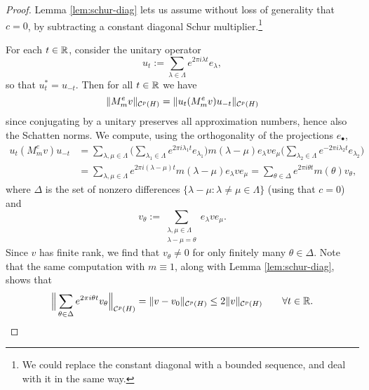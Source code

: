 \begin{proof}
  Lemma \ref{lem:schur-diag} lets us assume without loss of generality that $c = 0$, by subtracting a constant diagonal Schur multiplier.\footnote{We could replace the constant diagonal with a bounded sequence, and deal with it in the same way.}
  
  For each $t \in \mathbb{R}$, consider the unitary operator
  \begin{equation*}
    u_{t} := \sum_{\lambda \in \Lambda} e^{2\pi i \lambda t} e_{\lambda}, 
  \end{equation*}
  so that $u_{t}^{*} = u_{-t}$.
  Then for all $t \in \mathbb{R}$ we have
  \begin{equation*}
    \| M_{m}^{e} v \|_{\mathcal{C}^{p}(H)} = 
    \|u_{t}  (M_{m}^{e} v) u_{-t} \|_{\mathcal{C}^{p}(H)}
  \end{equation*}
  since conjugating by a unitary preserves all approximation numbers, hence also the Schatten norms.
  We compute, using the orthogonality of the projections $e_{\bullet}$,
  \begin{equation*}
    \begin{aligned}
      u_{t}  (M_{m}^{e} v) u_{-t}
      &= \sum_{\lambda, \mu \in \Lambda} \Big( \sum_{\lambda_{1} \in \Lambda} e^{2\pi i \lambda_{1} t} e_{\lambda_{1}} \Big)  m(\lambda - \mu) e_{\lambda} v e_{\mu} \Big(\sum_{\lambda_{2} \in \Lambda} e^{-2\pi i \lambda_{2} t} e_{\lambda_{2}} \Big) \\
      &= \sum_{\lambda, \mu \in \Lambda} e^{2\pi i (\lambda - \mu) t}  m(\lambda - \mu) e_{\lambda} v e_{\mu} 
      = \sum_{\theta \in \Delta} e^{2\pi i \theta t} m(\theta) v_{\theta},
    \end{aligned}
  \end{equation*}
  where $\Delta$ is the set of nonzero differences $\{\lambda - \mu: \lambda \neq \mu \in \Lambda\}$ (using that $c = 0$)
  and
  \begin{equation*}
    v_{\theta} := \sum_{\substack{\lambda,\mu \in \Lambda \\ \lambda - \mu = \theta}} e_{\lambda} v e_{\mu}.
  \end{equation*}
  Since $v$ has finite rank, we find that $v_{\theta} \neq 0$ for only finitely many $\theta \in \Delta$.
  Note that the same computation with $m \equiv 1$, along with Lemma \ref{lem:schur-diag}, shows that
  \begin{equation*}
    \Big\| \sum_{\theta \in \Delta} e^{2\pi i \theta t} v_{\theta}\Big\|_{\mathcal{C}^{p}(H)} = \|v - v_{0}\|_{\mathcal{C}^{p}(H)} \leq 2\|v\|_{\mathcal{C}^{p}(H)}  \qquad \forall t \in \mathbb{R}.
  \end{equation*}
 

\end{proof}
